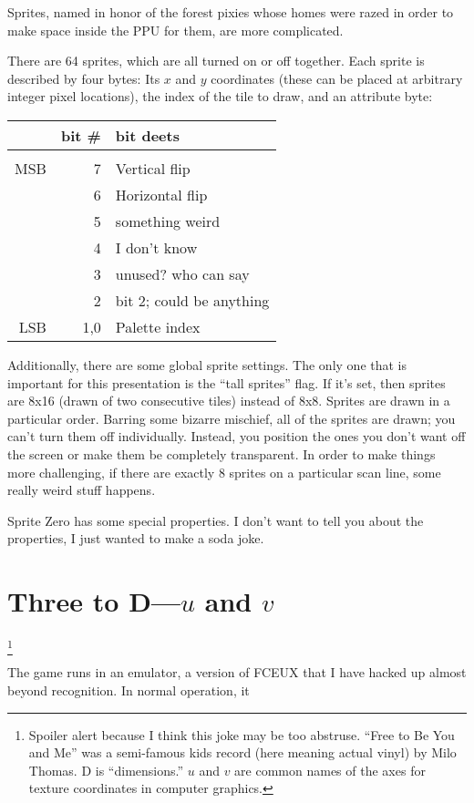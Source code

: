 \documentclass[twocolumn]{article}
\begin{document}
Sprites, named in honor of the forest pixies whose homes were razed in
order to make space inside the PPU for them, are more complicated.

There are 64 sprites, which are all turned on or off together. Each
sprite is described by four bytes: Its $x$ and $y$ coordinates (these
can be placed at arbitrary integer pixel locations), the index of
the tile to draw, and an attribute byte:

\begin{tabular}{rrl}
    & bit \# & bit deets \\
\hline \\
MSB & 7      & Vertical flip \\
    & 6      & Horizontal flip \\
    & 5      & something weird \\
    & 4      & I don't know \\
    & 3      & unused? who can say \\
    & 2      & bit 2; could be anything \\
LSB & 1,0    & Palette index \\
\end{tabular}

Additionally, there are some global sprite settings. The only one that
is important for this presentation is the ``tall sprites'' flag. If
it's set, then sprites are 8x16 (drawn of two consecutive tiles)
instead of 8x8. Sprites are drawn in a particular order. Barring some
bizarre mischief, all of the sprites are drawn; you can't turn them
off individually. Instead, you position the ones you don't want off
the screen or make them be completely transparent. In order to make
things more challenging, if there are exactly 8 sprites on a
particular scan line, some really weird stuff happens. %

Sprite Zero has some special properties. I don't want to tell you
about the properties, I just wanted to make a soda joke.

\section{Three to D---$u$ and $v$}\footnote{Spoiler alert because I think
this joke may be too abstruse. ``Free to Be You and Me'' was a
semi-famous kids record (here meaning actual vinyl) by 
Milo Thomas. D is ``dimensions.'' $u$ and $v$ are common names of
the axes for texture coordinates in computer graphics.}

The game runs in an emulator, a version of FCEUX\cite{fceux} that I
have hacked up almost beyond recognition. In normal operation, it
\end{document}
